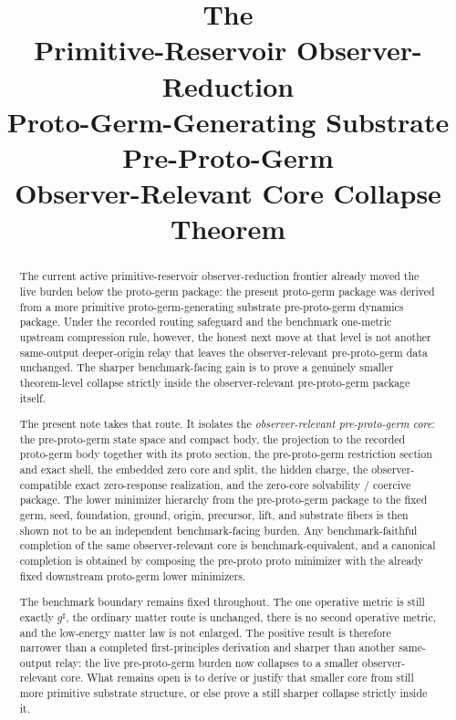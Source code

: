 \documentclass[11pt]{article}
\title{\textbf{The \TheoryName{}}\\[0.4em]
\large Primitive-Reservoir Observer-Reduction\\
\large Proto-Germ-Generating Substrate Pre-Proto-Germ\\
\large Observer-Relevant Core Collapse Theorem}
\author{}
\date{}
\newcommand{\CompletedMetric}{g^{\sharp}}
\begin{document}
\maketitle

\begin{abstract}
The current active primitive-reservoir observer-reduction frontier already moved the live burden below the proto-germ package: the present proto-germ package was derived from a more primitive proto-germ-generating substrate pre-proto-germ dynamics package. Under the recorded routing safeguard and the benchmark one-metric upstream compression rule, however, the honest next move at that level is not another same-output deeper-origin relay that leaves the observer-relevant pre-proto-germ data unchanged. The sharper benchmark-facing gain is to prove a genuinely smaller theorem-level collapse strictly inside the observer-relevant pre-proto-germ package itself.

The present note takes that route. It isolates the \emph{observer-relevant pre-proto-germ core}: the pre-proto-germ state space and compact body, the projection to the recorded proto-germ body together with its proto section, the pre-proto-germ restriction section and exact shell, the embedded zero core and split, the hidden charge, the observer-compatible exact zero-response realization, and the zero-core solvability / coercive package. The lower minimizer hierarchy from the pre-proto-germ package to the fixed germ, seed, foundation, ground, origin, precursor, lift, and substrate fibers is then shown not to be an independent benchmark-facing burden. Any benchmark-faithful completion of the same observer-relevant core is benchmark-equivalent, and a canonical completion is obtained by composing the pre-proto proto minimizer with the already fixed downstream proto-germ lower minimizers.

The benchmark boundary remains fixed throughout. The one operative metric is still exactly \(\CompletedMetric\), the ordinary matter route is unchanged, there is no second operative metric, and the low-energy matter law is not enlarged. The positive result is therefore narrower than a completed first-principles derivation and sharper than another same-output relay: the live pre-proto-germ burden now collapses to a smaller observer-relevant core. What remains open is to derive or justify that smaller core from still more primitive substrate structure, or else prove a still sharper collapse strictly inside it.
\end{abstract}
\end{document}
